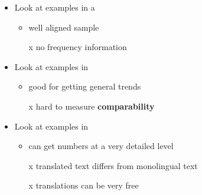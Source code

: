 \documentclass[a4paper,landscape,headrule,footrule,dvips]{foils}
\begin{document}
\begin{CJK}{UTF8}{min}

\begin{itemize}
\item Look at examples in a 
  \begin{itemize}
  \item well aligned sample
  \item[x] no frequency information
  \end{itemize}
\item Look at examples in  
  \begin{itemize}
  \item good for getting general trends
  \item[x] hard to measure \textbf{comparability}
  \end{itemize}
\item Look at examples in  
  \begin{itemize}
  \item can get numbers at a very detailed level
  \item[x] translated text differs from monolingual text
  \item[x] translations can be very free
  \end{itemize}
\end{itemize}




\end{CJK}
\end{document}
